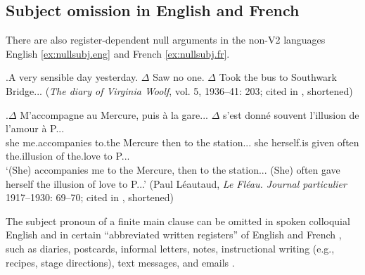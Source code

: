 \subsection{Subject omission in English and French}\label{sec:english.french}
There are also register-dependent null arguments  in the non-V2 languages English \ref{ex:nullsubj.eng} and French \ref{ex:nullsubj.fr}.

\ex.\label{ex:nullsubj.eng}A very sensible day yesterday. $\Delta$ Saw no one. $\Delta$ Took the bus to Southwark Bridge... (\emph{The diary of Virginia Woolf}, vol. 5, 1936--41: 203; cited in \cite[167]{haegeman1990}, shortened)

\exg.\label{ex:nullsubj.fr}$\Delta$ M'accompagne au Mercure, puis à la gare... $\Delta$ s'est donné souvent l'illusion de l'amour à P... \\
she me.accompanies to.the Mercure then to the station... she herself.is given often the.illusion of the.love to P... \\
`(She) accompanies me to the Mercure, then to the station...  (She) often gave herself the illusion of love to P...' (Paul Léautaud, \emph{Le Fléau. Journal particulier} 1917--1930: 69--70; cited in \cite[167]{haegeman1990}, shortened)

The subject pronoun of a finite main clause can be omitted in spoken colloquial English \citep{haegeman1997, weir2012} and in certain ``abbreviated written registers'' \citep[233]{haegeman1997} of English  and French \citep[see also][]{haegeman1990,haegeman2000,weir2012}, such as diaries, postcards, informal letters, notes, instructional writing (e.g., recipes, stage directions), text messages, and emails \citep{haegeman1990, haegeman1997, haegeman2017, weir2012}.

